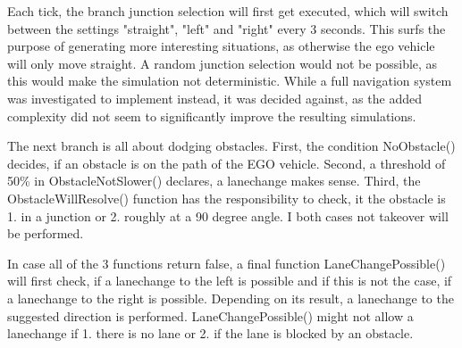 Each tick, the branch junction selection will first get executed, which will switch between the settings "straight", "left" and "right" every 3 seconds. This surfs the purpose of generating more interesting situations, as otherwise the ego vehicle will only move straight. A random junction selection would not be possible, as this would make the simulation not deterministic.
While a full navigation system was investigated to implement instead, it was decided against, as the added complexity did not seem to significantly improve the resulting simulations.

The next branch is all about dodging obstacles. First, the condition NoObstacle() decides, if an obstacle is on the path of the EGO vehicle. Second, a threshold of 50\% in ObstacleNotSlower() declares, a lanechange makes sense. Third, the ObstacleWillResolve() function has the responsibility to check, it the obstacle is 1. in a junction or 2. roughly at a 90 degree angle. I both cases not takeover will be performed.

In case all of the 3 functions return false, a final function LaneChangePossible() will first check, if a lanechange to the left is possible and if this is not the case, if a lanechange to the right is possible. Depending on its result, a lanechange to the suggested direction is performed.
LaneChangePossible() might not allow a lanechange if 1. there is no lane or 2. if the lane is blocked by an obstacle.


